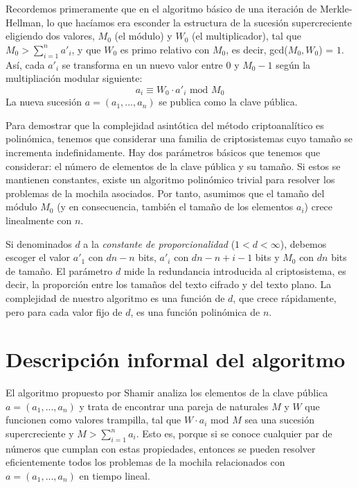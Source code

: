     Recordemos primeramente que en el algoritmo básico de una iteración de Merkle-Hellman, lo que hacíamos era esconder la estructura de la sucesión supercreciente eligiendo dos valores, $M_{0}$ (el módulo) y $W_{0}$ (el multiplicador), tal que $M_{0} > \sum_{i=1}^{n} a'_{i}$, y que $W_{0}$ es primo relativo con $M_{0}$, es decir, gcd($M_{0}, W_{0}$) = $1$. Así, cada $a'_{i}$ se transforma en un nuevo valor entre $0$ y $M_{0} - 1$ según la multipliación modular siguiente:
    \begin{equation}
        a_{i} \equiv W_{0} \cdot a'_{i} \text{ mod } M_{0}
    \end{equation}
    La nueva sucesión $a = (a_{1}, ... , a_{n})$ se publica como la clave pública.
    
    Para demostrar que la complejidad asintótica del método criptoanalítico es polinómica, tenemos que considerar una familia de criptosistemas cuyo tamaño se incrementa indefinidamente. Hay dos parámetros básicos que tenemos que considerar: el número de elementos de la clave pública y su tamaño. Si estos se mantienen constantes, existe un algoritmo polinómico trivial para resolver los problemas de la mochila asociados. Por tanto, asumimos que el tamaño del módulo $M_{0}$ (y en consecuencia, también el tamaño de los elementos $a_{i}$) crece linealmente con $n$.

    Si denominados $d$ a la \textit{constante de proporcionalidad} ($1 < d < \infty$), debemos escoger el valor $a'_{1}$ con $dn - n$ bits, $a'_{i}$ con $dn - n + i - 1$ bits y $M_{0}$ con $dn$ bits de tamaño. El parámetro $d$ mide la redundancia introducida al criptosistema, es decir, la proporción entre los tamaños del texto cifrado y del texto plano. La complejidad de nuestro algoritmo es una función de $d$, que crece rápidamente, pero para cada valor fijo de $d$, es una función polinómica de $n$.

    \section{Descripción informal del algoritmo}

    El algoritmo propuesto por Shamir analiza los elementos de la clave pública $a = (a_{1}, ... , a_{n})$ y trata de encontrar una pareja de naturales $M$ y $W$ que funcionen como valores trampilla, tal que $W \cdot a_{i} \text{ mod } M$ sea una sucesión supercreciente y $M > \sum_{i=1}^{n} a_{i}$. Esto es, porque si se conoce cualquier par de números que cumplan con estas propiedades, entonces se pueden resolver eficientemente todos los problemas de la mochila relacionados con $a = (a_{1}, ... , a_{n})$ en tiempo lineal.

